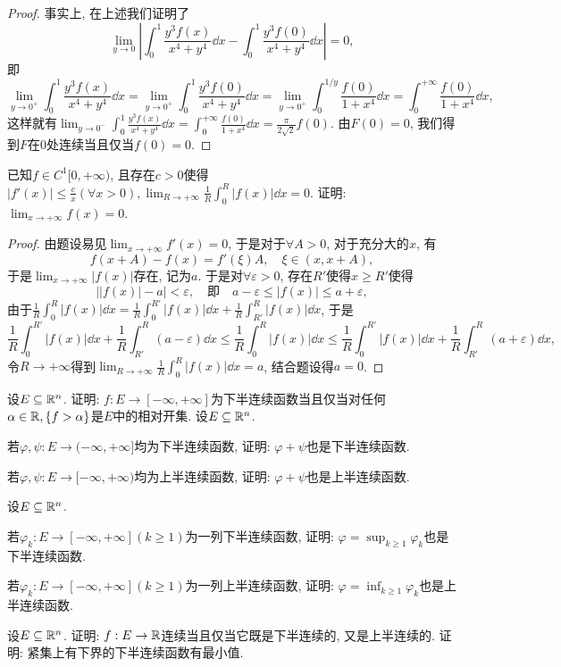 \begin{quiza}
\begin{proof}
事实上, 在上述我们证明了\[\lim_{y\rightarrow 0}\left|\int_{0}^{1}\frac{y^3f(x)}{x^4+y^4}\dd x-\int_{0}^{1}\frac{y^3f(0)}{x^4+y^4}\dd x\right|=0,\]即\[\lim_{y\rightarrow 0^+}\int_{0}^{1}\frac{y^3f(x)}{x^4+y^4}\dd x=\lim_{y\rightarrow 0^+}\int_{0}^{1}\frac{y^3f(0)}{x^4+y^4}\dd x=\lim_{y\rightarrow 0^+}\int_{0}^{1/y}\frac{f(0)}{1+x^4}\dd x=\int_{0}^{+\infty}\frac{f(0)}{1+x^4}\dd x,\]这样就有\(\lim_{y\rightarrow 0^-}\int_{0}^{1}\frac{y^3f(x)}{x^4+y^4}\dd x=\int_{0}^{+\infty}\frac{f(0)}{1+x^4}\dd x=\frac{\pi}{2\sqrt{2}}f(0).\) 由\(F(0)=0\), 我们得到\(F\)在0处连续当且仅当\(f(0)=0\).
\end{proof}
\woe 已知\(f\in C^1[0,+\infty)\), 且存在\(c>0\)使得\(|f'(x)|\leqslant\frac{c}{x}(\forall x>0),\lim_{R\rightarrow+\infty}\frac{1}{R}\int_{0}^{R}|f(x)|\dd x=0\). 证明: \(\lim_{x\rightarrow+\infty}f(x)=0\).
\begin{proof}
由题设易见\(\lim_{x\rightarrow+\infty}f'(x)=0\), 于是对于\(\forall A>0\), 对于充分大的\(x\), 有\[f(x+A)-f(x)=f'(\xi)A,\quad \xi\in(x,x+A),\]于是\(\lim_{x\rightarrow+\infty}|f(x)|\)存在, 记为\(a\). 于是对\(\forall\varepsilon>0\), 存在\(R'\)使得\(x\geqslant R'\)使得\[\left||f(x)|-a\right|<\varepsilon,\quad\text{即}\quad a-\varepsilon\leqslant |f(x)|\leqslant a+\varepsilon,\]
由于\(\frac{1}{R}\int_{0}^{R}|f(x)|\dd x=\frac{1}{R}\int_{0}^{R'}|f(x)|\dd x+\frac{1}{R}\int_{R'}^{R}|f(x)|\dd x\), 于是
\[\frac{1}{R}\int_{0}^{R'}|f(x)|\dd x+\frac{1}{R}\int_{R'}^{R}(a-\varepsilon)\dd x\leqslant\frac{1}{R}\int_{0}^{R}|f(x)|\dd x\leqslant\frac{1}{R}\int_{0}^{R'}|f(x)|\dd x+\frac{1}{R}\int_{R'}^{R}(a+\varepsilon)\dd x,\]令\(R\rightarrow+\infty\)得到\(\lim_{R\rightarrow+\infty}\frac{1}{R}\int_{0}^{R}|f(x)|\dd x=a\), 结合题设得\(a=0\).
\end{proof}
\woe 设\(E\subseteq\mathbb{R}^n\). 证明: \(f:E\rightarrow[-\infty,+\infty]\)为下半连续函数当且仅当对任何\(\alpha\in\mathbb{R},\{f>\alpha\}\)是\(E\)中的相对开集.
\woe 设\(E\subseteq\mathbb{R}^n\).\begin{quizs}
\item 若\(\varphi,\psi:E\rightarrow(-\infty,+\infty]\)均为下半连续函数, 证明: \(\varphi+\psi\)也是下半连续函数.
\item 若\(\varphi,\psi:E\rightarrow[-\infty,+\infty)\)均为上半连续函数, 证明: \(\varphi+\psi\)也是上半连续函数.
\end{quizs}
\woe 设\(E\subseteq\mathbb{R}^n\).\begin{quizs}
\item 若\(\varphi_k:E\rightarrow[-\infty,+\infty](k\geqslant 1)\)为一列下半连续函数, 证明: \(\varphi=\sup_{k\geqslant 1}\varphi_k\)也是下半连续函数.
\item 若\(\varphi_k:E\rightarrow[-\infty,+\infty](k\geqslant 1)\)为一列上半连续函数, 证明: \(\varphi=\inf_{k\geqslant 1}\varphi_k\)也是上半连续函数.
\end{quizs}
\woe 设\(E\subseteq\mathbb{R}^n\). 证明: \(f:E\rightarrow\mathbb{R}\)连续当且仅当它既是下半连续的, 又是上半连续的.
\woe 证明: 紧集上有下界的下半连续函数有最小值.
\end{quiza}
